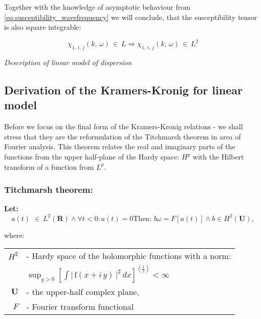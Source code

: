 \documentclass[12pt,twoside,a4paper]{article}
\numberwithin{equation}{subsection}
\numberwithin{figure}{subsection}
\begin{document}
Together with the knowledge of asymptotic behaviour from \ref{eq:susceptibility_wavefrequency} we will conclude, that the susceptibility
tensor is also square integrable:

\begin{equation} \label{eq:susceptibility_sqrintegrable}
  \chi_{1, \,i, \,j}(k, \,\omega ) \,\in \,L \Rightarrow \chi_{1, \,i, \,j} (k, \,\omega )\,\in\,L^{2}
\end{equation}


\textit{Description of linear model of dispersion}

\subsection{Derivation of the Kramers-Kronig for linear model} \label{chap:problem_dlin}

Before we focus on the final form of the Kramers-Kronig relations - we shall stress that they are the reformulation of the Titchmarsh theorem
in area of Fourier analysis. This theorem relates the real and imaginary parts of the functions from the upper half-plane of the
Hardy space: $H^{p}$ with the Hilbert transform of a function from $L^{p}$.

\subsubsection*{Titchmarsh theorem:}

\textbf{Let:}
\begin{subequations}  \label{eq:titchmarsh_theorem}
 \begin{equation}  \label{eq:titchmarsh_assumption}
   a(t)\,\ \in \,L^{2}(\mathbf{R}) \wedge \forall t < 0 : a(t) = 0
  \end{equation}
  \begin{equation} \label{eq:titchmarsh_thesis}
    \mbox{Then: }  b{\omega} = F[a(t)] \wedge b \in H^2(\textbf{U}),
  \end{equation}
\end{subequations}

where:

\begin{tabular} {r l}
  $H^{2}$ & - Hardy space of the holomorphic functions with a norm: \\
  \, & $\sup_{y > 0} [\int  \left|  \! \,\mathrm{f}(x + i\,y)\, \!  \right| ^{2}\,dx] ^{(\frac {1}{2})} < \infty$ \\
  $\mathbf{U}$ & - the upper-half complex plane, \\
  $F$ & - Fourier transform functional \\
\end{tabular} 
\end{document}
